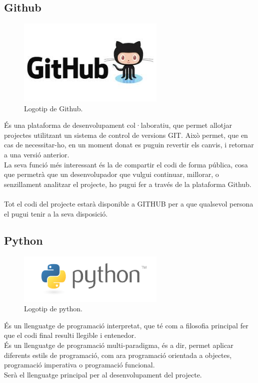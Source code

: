 \documentclass[12pt,a4paper,openright,oneside]{article}
\numberwithin{equation}{section}
\theoremstyle{definition}
\begin{document}
\subsection*{Github}
\begin{figure}[htbp]
\centering
\includegraphics[width=7cm]{github.jpg}
\caption{Logotip de Github.}
\end{figure}
És una plataforma de desenvolupament col·laboratiu, que permet allotjar projectes utilitzant un sistema de control de versions GIT. Això permet, que en cas de necessitar-ho, en un moment donat es puguin revertir els canvis, i retornar a una versió anterior.\\
La seva funció més interessant és la de compartir el codi de forma pública, cosa que permetrà que un desenvolupador que vulgui continuar, millorar, o senzillament analitzar el projecte, ho pugui fer a través de la plataforma Github.\\\\
Tot el codi del projecte estarà disponible a GITHUB per a que qualsevol persona el pugui tenir a la seva disposició.\cite{github}
\subsection*{Python}
\begin{figure}[htbp]
\centering
\includegraphics[width=7cm]{python.png}
\caption{Logotip de python.}
\end{figure}
És un llenguatge de programació interpretat, que té com a filosofia principal fer que el codi final resulti llegible i entenedor. \\
És un llenguatge de programació multi-paradigma, és a dir, permet aplicar diferents estils de programació, com ara programació orientada a objectes, programació imperativa o programació funcional.\\
Serà el llenguatge principal per al desenvolupament del projecte.\cite{python}
\newpage
\end{document}
